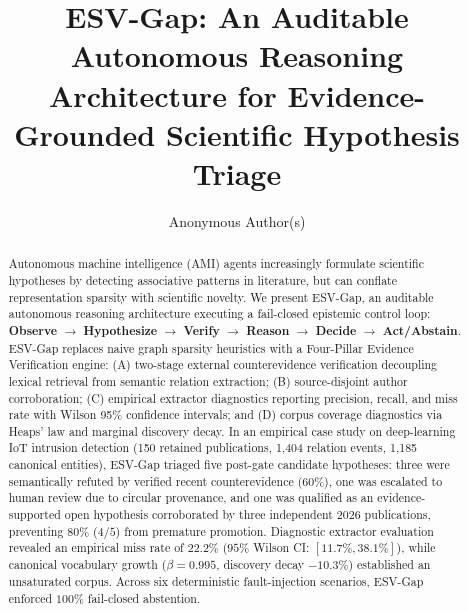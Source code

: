 \documentclass[runningheads]{llncs}
\newcommand{\method}{ESV-Gap}
\begin{document}
\title{ESV-Gap: An Auditable Autonomous Reasoning Architecture for Evidence-Grounded Scientific Hypothesis Triage}

\author{Anonymous Author(s)}

\maketitle

\begin{abstract}
Autonomous machine intelligence (AMI) agents increasingly formulate scientific hypotheses by detecting associative patterns in literature, but can conflate representation sparsity with scientific novelty. We present \method{}, an auditable autonomous reasoning architecture executing a fail-closed epistemic control loop: \textbf{Observe} $\rightarrow$ \textbf{Hypothesize} $\rightarrow$ \textbf{Verify} $\rightarrow$ \textbf{Reason} $\rightarrow$ \textbf{Decide} $\rightarrow$ \textbf{Act/Abstain}. \method{} replaces naive graph sparsity heuristics with a Four-Pillar Evidence Verification engine: (A) two-stage external counterevidence verification decoupling lexical retrieval from semantic relation extraction; (B) source-disjoint author corroboration; (C) empirical extractor diagnostics reporting precision, recall, and miss rate with Wilson 95\% confidence intervals; and (D) corpus coverage diagnostics via Heaps' law and marginal discovery decay. In an empirical case study on deep-learning IoT intrusion detection (150 retained publications, 1,404 relation events, 1,185 canonical entities), \method{} triaged five post-gate candidate hypotheses: three were semantically refuted by verified recent counterevidence ($60\%$), one was escalated to human review due to circular provenance, and one was qualified as an evidence-supported open hypothesis corroborated by three independent 2026 publications, preventing $80\%$ ($4/5$) from premature promotion. Diagnostic extractor evaluation revealed an empirical miss rate of $22.2\%$ ($95\%$ Wilson CI: $[11.7\%, 38.1\%]$), while canonical vocabulary growth ($\beta = 0.995$, discovery decay $-10.3\%$) established an unsaturated corpus. Across six deterministic fault-injection scenarios, \method{} enforced $100\%$ fail-closed abstention.

\end{abstract}
\end{document}

